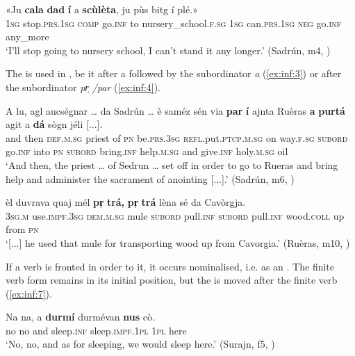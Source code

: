 \ea\label{ex:inf:3a}
\gll  «Ju \textbf{cala} \textbf{dad} \textbf{í} a \textbf{scùlèta}, ju pùs bitg í plé.»\\
\textsc{1sg} stop.\textsc{prs.1sg} \textsc{comp} go.\textsc{inf} to nursery\_school.\textsc{f.sg} \textsc{1sg} can.\textsc{prs.1sg} \textsc{neg} go.\textsc{inf} any\_more  \\
\glt `I’ll stop going to nursery school, I can’t stand it any longer.' (Sadrún, m4, )
\z


The  is used in , be it after a  followed by the subordinator \textit{a} (\ref{ex:inf:3}) or after the subordinator \textit{ pr̩ /par} (\ref{ex:inf:4}).

\ea\label{ex:inf:3}
\gll    A lu, agl aucségnar … da Sadrún … è saméz sén via \textbf{par} \textbf{í} ajnta Ruèras \textbf{a} \textbf{purtá} agit a \textbf{dá} sògn jéli [...].\\
and then \textsc{def.m.sg} priest {} of \textsc{pn} {} be.\textsc{prs.3sg} \textsc{refl.}put.\textsc{ptcp.m.sg} on way.\textsc{f.sg} \textsc{subord} go.\textsc{inf} into \textsc{pn}  \textsc{subord} bring.\textsc{inf} help.\textsc{m.sg} and give.\textsc{inf} holy.\textsc{m.sg} oil\\
\glt `And then, the priest … of Sedrun … set off in order to go to Rueras and bring help and administer the sacrament of anointing [...].' (Sadrún, m6, )
\z

\ea\label{ex:inf:4}
\gll [...] èl duvrava quaj mél \textbf{pr̩} \textbf{trá,} \textbf{pr̩} \textbf{trá} lèna sé da Cavòrgja.\\
{} \textsc{3sg.m} use.\textsc{impf.3sg} \textsc{dem.m.sg} mule \textsc{subord} pull.\textsc{inf} \textsc{subord} pull.\textsc{inf} wood.\textsc{coll} up from \textsc{pn}  \\
\glt `[...] he used that mule for transporting wood up from Cavorgia.' (Ruèras, m10, )
\z

If a verb is fronted in order to  it, it occurs nominalised, i.e. as an . The finite verb form remains in its initial position, but the  is moved after the finite verb (\ref{ex:inf:7}).

\ea\label{ex:inf:7}
\gll Na na, a \textbf{durmí} durmévan \textbf{nus} cò. \\
no no and sleep.\textsc{inf} sleep.\textsc{impf.1pl} \textsc{1pl} here\\
\glt `No, no, and as for sleeping, we would sleep here.' (Surajn, f5, )
\z

